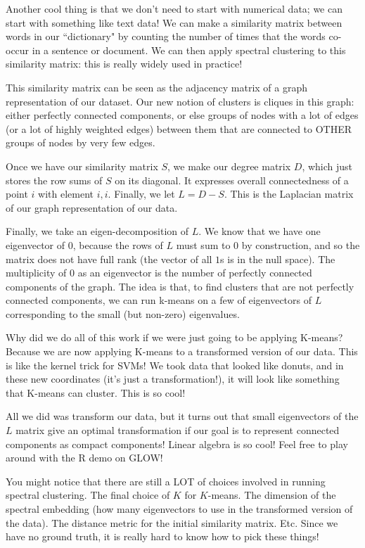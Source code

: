 Another cool thing is that we don't need to start with numerical data; we can start with something like text data! We can make a similarity matrix between words in our ``dictionary" by counting the number of times that the words co-occur in a sentence or document. We can then apply spectral clustering to this similarity matrix: this is really widely used in practice!

This similarity matrix can be seen as the adjacency matrix of a graph representation of our dataset. Our new notion of clusters is cliques in this graph: either perfectly connected components, or else groups of nodes with a lot of edges (or a lot of highly weighted edges) between them that are connected to OTHER groups of nodes by very few edges. 

Once we have our similarity matrix $S$, we make our degree matrix $D$, which just stores the row sums of $S$ on its diagonal. It expresses overall connectedness of a point $i$ with element $i,i$. Finally, we let $L = D-S$. This is the Laplacian matrix of our graph representation of our data.

Finally, we take an eigen-decomposition of $L$. We know that we have one eigenvector of $0$, because the rows of $L$ must sum to $0$ by construction, and so the matrix does not have full rank (the vector of all $1$s is in the null space). The multiplicity of $0$ as an eigenvector is the number of perfectly connected components of the graph. The idea is that, to find clusters that are not perfectly connected components, we can run k-means on a few of eigenvectors of $L$ corresponding to the small (but non-zero) eigenvalues. 

Why did we do all of this work if we were just going to be applying K-means? Because we are now applying K-means to a transformed version of our data. This is like the kernel trick for SVMs! We took data that looked like donuts, and in these new coordinates (it's just a transformation!), it will look like something that K-means can cluster. This is so cool!

All we did was transform our data, but it turns out that small eigenvectors of the $L$ matrix give an optimal transformation if our goal is to represent connected components as compact components! Linear algebra is so cool! Feel free to play around with the R demo on GLOW!

You might notice that there are still a LOT of choices involved in running spectral clustering. The final choice of $K$ for $K$-means. The dimension of the spectral embedding (how many eigenvectors to use in the transformed version of the data). The distance metric for the initial similarity matrix. Etc. Since we have no ground truth, it is really hard to know how to pick these things!

